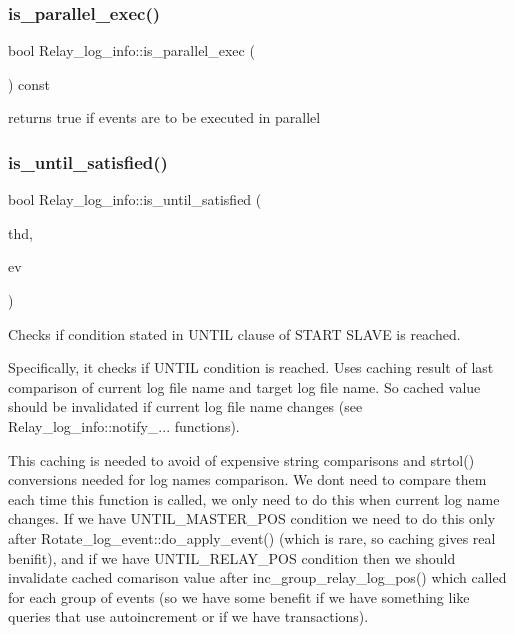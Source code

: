 \subsubsection{\texorpdfstring{is\+\_\+parallel\+\_\+exec()}{is\_parallel\_exec()}}
{\footnotesize\ttfamily bool Relay\+\_\+log\+\_\+info\+::is\+\_\+parallel\+\_\+exec (\begin{DoxyParamCaption}{ }\end{DoxyParamCaption}) const\hspace{0.3cm}{\ttfamily [inline]}}

returns true if events are to be executed in parallel \mbox{\label{classRelay__log__info_a98739303e81c718cc7b171ede3b0c0b7}} 
\subsubsection{\texorpdfstring{is\+\_\+until\+\_\+satisfied()}{is\_until\_satisfied()}}
{\footnotesize\ttfamily bool Relay\+\_\+log\+\_\+info\+::is\+\_\+until\+\_\+satisfied (\begin{DoxyParamCaption}\item[{T\+HD $\ast$}]{thd,  }\item[{\mbox{\hyperlink{classLog__event}{Log\+\_\+event}} $\ast$}]{ev }\end{DoxyParamCaption})}

Checks if condition stated in U\+N\+T\+IL clause of S\+T\+A\+RT S\+L\+A\+VE is reached.

Specifically, it checks if U\+N\+T\+IL condition is reached. Uses caching result of last comparison of current log file name and target log file name. So cached value should be invalidated if current log file name changes (see {\ttfamily Relay\+\_\+log\+\_\+info\+::notify\+\_\+}... functions).

This caching is needed to avoid of expensive string comparisons and {\ttfamily strtol()} conversions needed for log names comparison. We don\textquotesingle{}t need to compare them each time this function is called, we only need to do this when current log name changes. If we have {\ttfamily U\+N\+T\+I\+L\+\_\+\+M\+A\+S\+T\+E\+R\+\_\+\+P\+OS} condition we need to do this only after {\ttfamily Rotate\+\_\+log\+\_\+event\+::do\+\_\+apply\+\_\+event()} (which is rare, so caching gives real benifit), and if we have {\ttfamily U\+N\+T\+I\+L\+\_\+\+R\+E\+L\+A\+Y\+\_\+\+P\+OS} condition then we should invalidate cached comarison value after {\ttfamily inc\+\_\+group\+\_\+relay\+\_\+log\+\_\+pos()} which called for each group of events (so we have some benefit if we have something like queries that use autoincrement or if we have transactions).

